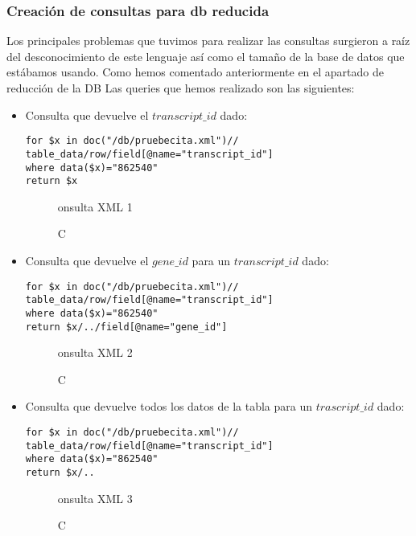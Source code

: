 \documentclass[12pt,a4paper]{article}
\begin{document}
\newpage

\subsubsection{Creación de consultas para db reducida} \label{pto422} 

Los principales problemas que tuvimos para realizar las consultas surgieron a raíz del desconocimiento de este lenguaje así como el tamaño de la base de datos que estábamos usando. Como hemos comentado anteriormente en el apartado de reducción de la DB
Las queries que hemos realizado son las siguientes:

\begin{itemize}

\item Consulta que devuelve el $transcript\_id$ dado:

\begin{verbatim}
for $x in doc("/db/pruebecita.xml")//
table_data/row/field[@name="transcript_id"]
where data($x)="862540"
return $x
\end{verbatim}

\begin{figure}[!h]
\centering
{}
\caption Consulta XML 1
\label{xml1}
\end{figure}

\item Consulta que devuelve el $gene\_id$ para un $transcript\_id$ dado:

\begin{verbatim}
for $x in doc("/db/pruebecita.xml")//
table_data/row/field[@name="transcript_id"]
where data($x)="862540"
return $x/../field[@name="gene_id"]
\end{verbatim}

\begin{figure}[!h]
\centering
{}
\caption Consulta XML 2
\label{xml2}
\end{figure}

\item Consulta que devuelve todos los datos de la tabla para un $trascript\_id$ dado:

\begin{verbatim}
for $x in doc("/db/pruebecita.xml")//
table_data/row/field[@name="transcript_id"]
where data($x)="862540"
return $x/..
\end{verbatim}

\begin{figure}[!h]
\centering
{}
\caption Consulta XML 3
\label{xml3}
\end{figure}



\end{itemize}
\end{document}
